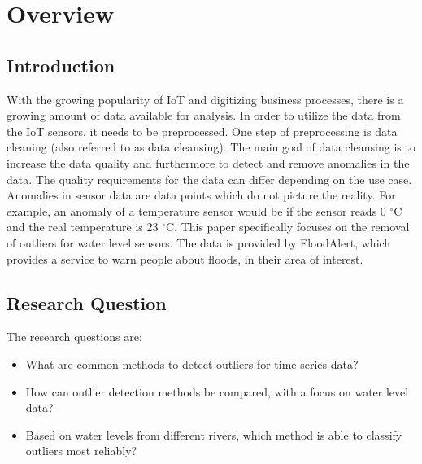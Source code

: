 \chapter{Overview}
\section{Introduction}\label{section:introduction}
With the growing popularity of \ac{IoT} and digitizing business processes, there is a growing amount of data available for analysis.
In order to utilize the data from the \ac{IoT} sensors, it needs to be preprocessed. One step of preprocessing is data cleaning (also referred to as data cleansing).
The main goal of data cleansing is to increase the data quality and furthermore to detect and remove anomalies in the data. The quality requirements for the data can differ depending on the use case. Anomalies in sensor data are data points which do not picture the reality. For example, an anomaly of a temperature sensor would be if the sensor reads 0 $^{\circ}$C and the real temperature is 23 $^{\circ}$C. This paper specifically focuses on the removal of outliers for water level sensors. The data is provided by FloodAlert\cite{strassmayrFloodAlertWaterLevels}, which provides a service to warn people about floods, in their area of interest.

\section{Research Question}
The research questions are:
\begin{itemize}
    \item What are common methods to detect outliers for time series data?
    \item How can outlier detection methods be compared, with a focus on water level data?
    \item Based on water levels from different rivers, which method is able to classify outliers most reliably?
\end{itemize}



